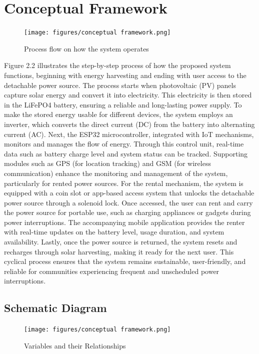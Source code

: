{\section{Conceptual Framework}

\begin{figure}[H]
	\centering
	\caption{Process flow on how the system operates}
	\label{fig:conceptualfra}
	\texttt{[image: figures/conceptual framework.png]}
\end{figure}


Figure 2.2 illustrates the step-by-step process of how the proposed system functions, beginning with energy harvesting and ending with user access to the detachable power source. The process starts when photovoltaic (PV) panels capture solar energy and convert it into electricity. This electricity is then stored in the LiFePO4 battery, ensuring a reliable and long-lasting power supply. To make the stored energy usable for different devices, the system employs an inverter, which converts the direct current (DC) from the battery into alternating current (AC). Next, the ESP32 microcontroller, integrated with IoT mechanisms, monitors and manages the flow of energy. Through this control unit, real-time data such as battery charge level and system status can be tracked. Supporting modules such as GPS (for location tracking) and GSM (for wireless communication) enhance the monitoring and management of the system, particularly for rented power sources. For the rental mechanism, the system is equipped with a coin slot or app-based access system that unlocks the detachable power source through a solenoid lock. Once accessed, the user can rent and carry the power source for portable use, such as charging appliances or gadgets during power interruptions. The accompanying mobile application provides the renter with real-time updates on the battery level, usage duration, and system availability. Lastly, once the power source is returned, the system resets and recharges through solar harvesting, making it ready for the next user. This cyclical process ensures that the system remains sustainable, user-friendly, and reliable for communities experiencing frequent and unscheduled power interruptions.

\subsection{Schematic Diagram}

\begin{figure}[H]
	\centering
	\caption{Variables and their Relationships}
	\label{fig:schematic}
	\texttt{[image: figures/conceptual framework.png]}
\end{figure}

}
